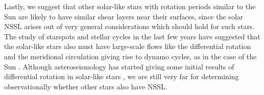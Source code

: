 Lastly, we suggest that other solar-like stars with rotation periods similar to the Sun are likely to have similar shear layers near their surfaces, since the solar NSSL arises out of very general considerations which should hold for such stars.  The study of starspots and stellar cycles in the last few years have suggested that the solar-like stars also must have large-scale flows like the differential rotation and the meridional circulation giving rise to dynamo cycles, as in the case of the Sun \citep{Karak2014a, Choudhuri2017, Hazra2019b}.  Although asteroseismology has started giving some initial results of differential rotation in solar-like stars \citep{Benomar2018}, we are still very far for determining observationally whether other stars also have NSSL.


